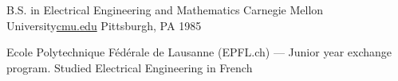 

\begin{cventries}

  \cventry
    {B.S. in Electrical Engineering and Mathematics} %
    {Carnegie Mellon University{\enskip\cdotp\enskip}\href{http://cmu.edu}{\faGraduationCap\acvHeaderIconSep cmu.edu}} %
    {Pittsburgh, PA} %
    {1985} %
    {
      \begin{cvitems} %
        \item {Ecole Polytechnique Fédérale de Lausanne (EPFL.ch) --- Junior year exchange program. Studied Electrical Engineering in French }
      \end{cvitems}
    }

\end{cventries}
